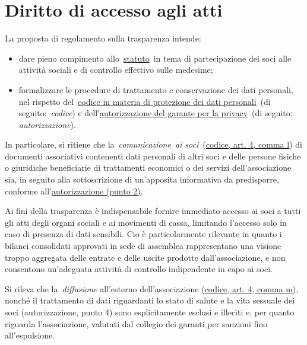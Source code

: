 \section{Diritto di accesso agli atti}
La proposta di regolamento sulla trasparenza intende:

\begin{itemize}
    \item
        dare pieno compimento
        allo~\href{http://www.alumniscuolagalileiana.it/wp-content/uploads/2017/03/Statuto-Alumni-SGSS.pdf}{statuto}~in
        tema di partecipazione dei soci alle attività sociali e di controllo
        effettivo sulle medesime;
    \item
        formalizzare le procedure di trattamento e conservazione dei dati
        personali, nel rispetto
        del~\href{http://www.garanteprivacy.it/web/guest/home/docweb/-/docweb-display/docweb/1311248}{codice
        in materia di protezione dei dati personali}~(di
        seguito:~\emph{codice}) e
        dell'\href{http://garanteprivacy.it/web/guest/home/docweb/-/docweb-display/docweb/5803310}{autorizzazione
        del garante per la privacy}~(di seguito: \emph{autorizzazione}).
\end{itemize}

In particolare, si ritiene che la~\emph{comunicazione}~\emph{ai
soci}~(\href{http://www.garanteprivacy.it/web/guest/home/docweb/-/docweb-display/docweb/1311248}{codice,
art. 4, comma l}) di documenti associativi contenenti dati personali di
altri soci e delle persone fisiche o giuridiche beneficiarie di
trattamenti economici o dei servizi dell'associazione sia, in seguito
alla sottoscrizione di un'apposita informativa da predisporre, conforme
all'\href{http://garanteprivacy.it/web/guest/home/docweb/-/docweb-display/docweb/5803310}{autorizzazione
(punto 2)}.

Ai fini della trasparenza è indispensabile fornire immediato accesso ai soci a tutti gli
atti degli organi sociali e ai movimenti di cassa, limitando l'accesso solo
in caso di presenza di dati sensibili.
Cio è particolarmente rilevante in quanto i bilanci consolidati approvati in
sede di assemblea rappresentano una visione troppo aggregata delle entrate
e delle uscite prodotte dall'associazione, e non consentono un'adeguata attività
di controllo indipendente in capo ai soci. 

Si rileva che la~\emph{diffusione} all'esterno dell'associazione
(\href{http://www.garanteprivacy.it/web/guest/home/docweb/-/docweb-display/docweb/1311248}{codice,
art. 4, comma m}), nonché il trattamento di dati riguardanti lo stato di
salute e la vita sessuale dei soci (autorizzazione, punto 4) sono
esplicitamente esclusi e illeciti e, per quanto riguarda
l'associazione, valutati dal collegio dei garanti per sanzioni
fino all'espulsione.
